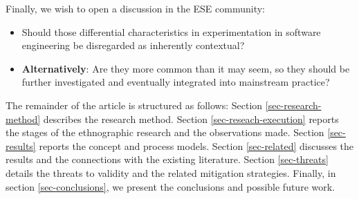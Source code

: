 Finally, we wish to open a discussion in the ESE community: 
\begin{itemize}
  \item Should those differential characteristics in experimentation in software engineering be disregarded as inherently contextual?
  \item  \textbf{Alternatively}: Are they more common than it may seem, so they should be further investigated and eventually integrated into mainstream practice?
\end{itemize}

The remainder of the article is structured as follows: Section \ref{sec-research-method} describes the research method. Section \ref{sec-reseach-execution} reports the stages of the ethnographic research and the observations made. Section \ref{sec-results} reports the concept and process models. Section \ref{sec-related} discusses the results and the connections with the existing literature. Section \ref{sec-threats} details the threats to validity and the related mitigation strategies. Finally, in section \ref{sec-conclusions}, we present the conclusions and possible future work.